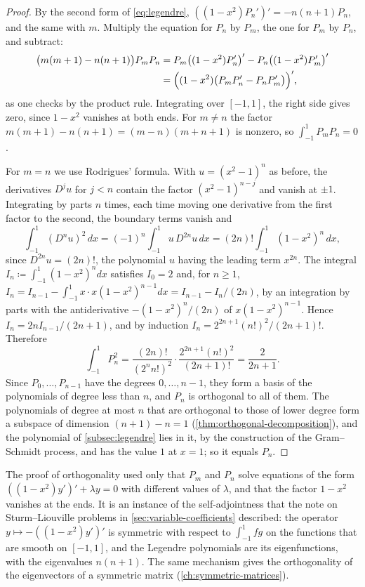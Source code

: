 \begin{proof}
By the second form of \eqref{eq:legendre}, $((1-x^2)P_n')'=-n(n+1)P_n$, and the same with $m$. Multiply the equation for $P_n$ by $P_m$, the one for $P_m$ by $P_n$, and subtract:
\begin{align*}
\bigl(m(m+1)-n(n+1)\bigr)P_mP_n&=P_m\bigl((1-x^2)P_n'\bigr)'-P_n\bigl((1-x^2)P_m'\bigr)'\\
&=\Bigl((1-x^2)\bigl(P_mP_n'-P_nP_m'\bigr)\Bigr)' ,
\end{align*}
as one checks by the product rule. Integrating over $[-1,1]$, the right side gives zero, since $1-x^2$ vanishes at both ends. For $m\ne n$ the factor $m(m+1)-n(n+1)=(m-n)(m+n+1)$ is nonzero, so $\int_{-1}^1P_mP_n=0$.

For $m=n$ we use Rodrigues' formula. With $u=(x^2-1)^n$ as before, the derivatives $D^ju$ for $j<n$ contain the factor $(x^2-1)^{n-j}$ and vanish at $\pm1$. Integrating by parts $n$ times, each time moving one derivative from the first factor to the second, the boundary terms vanish and
\[
\int_{-1}^1(D^nu)^2\,dx=(-1)^n\int_{-1}^1u\,D^{2n}u\,dx=(2n)!\int_{-1}^1(1-x^2)^n\,dx ,
\]
since $D^{2n}u=(2n)!$, the polynomial $u$ having the leading term $x^{2n}$. The integral $I_n\coloneqq\int_{-1}^1(1-x^2)^ndx$ satisfies $I_0=2$ and, for $n\ge1$, $I_n=I_{n-1}-\int_{-1}^1x\cdot x(1-x^2)^{n-1}dx=I_{n-1}-I_n/(2n)$, by an integration by parts with the antiderivative $-(1-x^2)^n/(2n)$ of $x(1-x^2)^{n-1}$. Hence $I_n=2nI_{n-1}/(2n+1)$, and by induction $I_n=2^{2n+1}(n!)^2/(2n+1)!$. Therefore
\[
\int_{-1}^1P_n^2=\frac{(2n)!}{(2^nn!)^2}\cdot\frac{2^{2n+1}(n!)^2}{(2n+1)!}=\frac2{2n+1} .
\]
Since $P_0,\ldots,P_{n-1}$ have the degrees $0,\ldots,n-1$, they form a basis of the polynomials of degree less than $n$, and $P_n$ is orthogonal to all of them. The polynomials of degree at most $n$ that are orthogonal to those of lower degree form a subspace of dimension $(n+1)-n=1$ (\cref{thm:orthogonal-decomposition}), and the polynomial of \cref{subsec:legendre} lies in it, by the construction of the Gram--Schmidt process, and has the value $1$ at $x=1$; so it equals $P_n$.
\end{proof}

The proof of orthogonality used only that $P_m$ and $P_n$ solve equations of the form $((1-x^2)y')'+\lambda y=0$ with different values of $\lambda$, and that the factor $1-x^2$ vanishes at the ends. It is an instance of the self-adjointness that the note on Sturm--Liouville problems in \cref{sec:variable-coefficients} described: the operator $y\mapsto-((1-x^2)y')'$ is symmetric with respect to $\int_{-1}^1fg$ on the functions that are smooth on $[-1,1]$, and the Legendre polynomials are its eigenfunctions, with the eigenvalues $n(n+1)$. The same mechanism gives the orthogonality of the eigenvectors of a symmetric matrix (\cref{ch:symmetric-matrices}).

